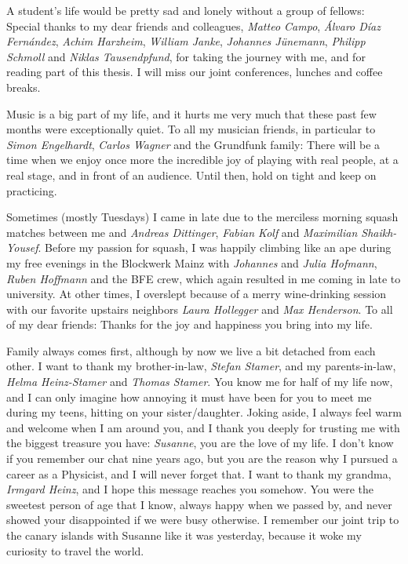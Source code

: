 A student's life would be pretty sad and lonely without a group of fellows:
Special thanks to my dear friends and colleagues, {\it Matteo Campo}, {\it Álvaro Díaz Fernández}, {\it Achim Harzheim}, {\it William Janke}, {\it Johannes Jünemann}, {\it Philipp Schmoll} and {\it Niklas Tausendpfund}, for taking the journey with me, and for reading part of this thesis.
I will miss our joint conferences, lunches and coffee breaks.

Music is a big part of my life, and it hurts me very much that these past few months were exceptionally quiet.
To all my musician friends, in particular to {\it Simon Engelhardt}, {\it Carlos Wagner} and the Grundfunk family:
There will be a time when we enjoy once more the incredible joy of playing with real people, at a real stage, and in front of an audience.
Until then, hold on tight and keep on practicing.

Sometimes (mostly Tuesdays) I came in late due to the merciless morning squash matches between me and {\it Andreas Dittinger}, {\it Fabian Kolf} and {\it Maximilian Shaikh-Yousef}.
Before my passion for squash, I was happily climbing like an ape during my free evenings in the Blockwerk Mainz with {\it Johannes} and {\it Julia Hofmann}, {\it Ruben Hoffmann} and the BFE crew, which again resulted in me coming in late to university.
At other times, I overslept because of a merry wine-drinking session with our favorite upstairs neighbors {\it Laura Hollegger} and {\it Max Henderson}.
To all of my dear friends: Thanks for the joy and happiness you bring into my life.

Family always comes first, although by now we live a bit detached from each other.
I want to thank my brother-in-law, {\it Stefan Stamer}, and my parents-in-law, {\it Helma Heinz-Stamer} and {\it Thomas Stamer}.
You know me for half of my life now, and I can only imagine how annoying it must have been for you to meet me during my teens, hitting on your sister/daughter.
Joking aside, I always feel warm and welcome when I am around you, and I thank you deeply for trusting me with the biggest treasure you have:
{\it Susanne}, you are the love of my life.
I don't know if you remember our chat nine years ago, but you are the reason why I pursued a career as a Physicist, and I will never forget that.
I want to thank my grandma, {\it Irmgard Heinz}, and I hope this message reaches you somehow.
You were the sweetest person of age that I know, always happy when we passed by, and never showed your disappointed if we were busy otherwise.
I remember our joint trip to the canary islands with Susanne like it was yesterday, because it woke my curiosity to travel the world.

